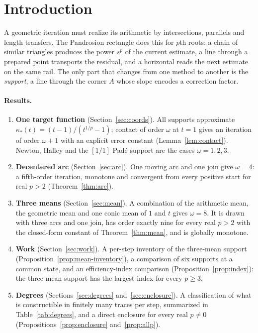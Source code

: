 \documentclass[10pt,a4paper]{article}
\theoremstyle{plain}
\theoremstyle{remark}
\numberwithin{equation}{section}
\begin{document}
\section{Introduction}

A geometric iteration must realize its arithmetic by intersections, parallels and length transfers.
The Pandrosion rectangle does this for $p$th roots: a chain of similar triangles produces the power
$s^p$ of the current estimate, a line through a prepared point transports the residual, and a horizontal
reads the next estimate on the same rail. The only part that changes from one method to another is the
\emph{support}, a line through the corner $A$ whose slope encodes a correction factor.

\paragraph{Results.}
\begin{enumerate}[label=\arabic*.]
\item \textbf{One target function} (Section~\ref{sec:coords}). All supports approximate
  $\kappa_*(t)=(t-1)/(t^{1/p}-1)$; contact of order $\omega$ at $t=1$ gives an iteration of order $\omega+1$ with
  an explicit error constant (Lemma~\ref{lem:contact}). Newton, Halley and the $[1/1]$ Pad\'e support are
  the cases $\omega=1,2,3$.
\item \textbf{Decentered arc} (Section~\ref{sec:arc}). One moving arc and one join give $\omega=4$:
  a fifth-order iteration, monotone and convergent from every positive start for real $p>2$
  (Theorem~\ref{thm:arc}).
\item \textbf{Three means} (Section~\ref{sec:mean}). A combination of the arithmetic mean, the
  geometric mean and one conic mean of $1$ and $t$ gives $\omega=8$. It is drawn with three arcs and
  one join, has order exactly nine for every real $p>2$ with the closed-form constant of
  Theorem~\ref{thm:mean}, and is globally monotone.
\item \textbf{Work} (Section~\ref{sec:work}). A per-step inventory of the three-mean support
  (Proposition~\ref{prop:mean-inventory}), a comparison of six supports at a common state, and an
  efficiency-index comparison (Proposition~\ref{prop:index}): the three-mean support has the largest
  index for every $p\ge3$.
\item \textbf{Degrees} (Sections~\ref{sec:degrees} and~\ref{sec:enclosure}). A classification of what
  is constructible in finitely many traces per step, summarized in Table~\ref{tab:degrees}, and a direct
  enclosure for every real $p\neq 0$ (Propositions~\ref{prop:enclosure} and~\ref{prop:allp}).
\end{enumerate}
\end{document}
